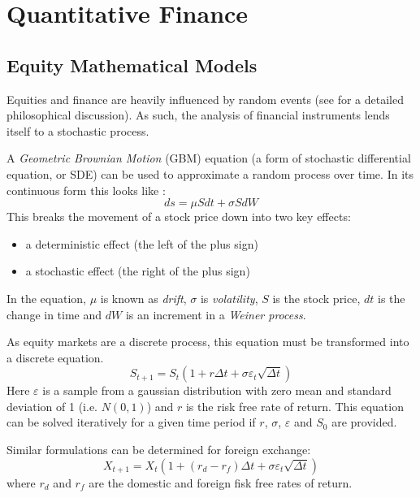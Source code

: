 \chapter{Quantitative Finance}
\label{ch:quantitative-finance}


\section{Equity Mathematical Models}
Equities and finance are heavily influenced by random events (see \cite{fooledbyrandomness} for a detailed philosophical discussion). As such, the analysis of financial instruments lends itself to a stochastic process.

A {\em Geometric Brownian Motion} (GBM) equation (a form of stochastic differential equation, or SDE) can be used to approximate a random process over time. In its continuous form this looks like \cite{advancedquantcpp}:
\begin{equation}
ds = \mu Sdt+\sigma SdW
\end{equation}
This breaks the movement of a stock price down into two key effects:

\begin{itemize}
	\item a deterministic effect (the left of the plus sign)
	\item a stochastic effect (the right of the plus sign)
\end{itemize}
In the equation, $\mu$ is known as {\it drift}, $\sigma$ is {\it volatility}, $S$ is the stock price, $dt$ is the change in time and $dW$ is an increment in a {\it Weiner process}.

As equity markets are a discrete process, this equation must be transformed into a discrete equation. 
\begin{equation}
S_{t+1}=S_t(1+r\Delta{}t+\sigma\varepsilon_t \sqrt{\Delta{}t})
\end{equation}
Here $\varepsilon$ is a sample from a gaussian distribution with zero mean and standard deviation of 1 (i.e. $N(0,1)$) and $r$ is the risk free rate of return. This equation can be solved iteratively for a given time period if $r$, $\sigma$, $\varepsilon$ and $S_0$ are provided.

Similar formulations can be determined for foreign exchange:
\begin{equation}
X_{t+1} = X_t(1+(r_d-r_f)\Delta{}t+\sigma\varepsilon_t\sqrt{\Delta{}t})
\label{eq:foreignexchangemodel}
\end{equation}
where $r_d$ and $r_f$ are the domestic and foreign fisk free rates of return. 




